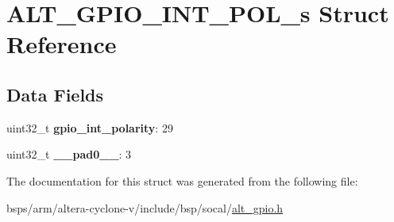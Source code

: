 \hypertarget{structALT__GPIO__INT__POL__s}{}\section{A\+L\+T\+\_\+\+G\+P\+I\+O\+\_\+\+I\+N\+T\+\_\+\+P\+O\+L\+\_\+s Struct Reference}
\label{structALT__GPIO__INT__POL__s}
\subsection*{Data Fields}
\begin{DoxyCompactItemize}
\item 
\mbox{\label{structALT__GPIO__INT__POL__s_aa104059b1523e13c96e1396e098eb154}} 
uint32\+\_\+t {\bfseries gpio\+\_\+int\+\_\+polarity}\+: 29
\item 
\mbox{\label{structALT__GPIO__INT__POL__s_afd082dde30d915dcf3f0865f11f953fd}} 
uint32\+\_\+t {\bfseries \+\_\+\+\_\+pad0\+\_\+\+\_\+}\+: 3
\end{DoxyCompactItemize}


The documentation for this struct was generated from the following file\+:\begin{DoxyCompactItemize}
\item 
bsps/arm/altera-\/cyclone-\/v/include/bsp/socal/\mbox{\hyperlink{alt__gpio_8h}{alt\+\_\+gpio.\+h}}\end{DoxyCompactItemize}
